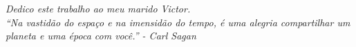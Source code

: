 \begin{dedicatoria}
   \vspace*{\fill}
   \centering
   \noindent
   \textit{Dedico este trabalho ao meu marido Victor. \\ ``Na vastidão do espaço e na imensidão do tempo, é uma alegria compartilhar um planeta e uma época com você.'' - Carl Sagan} \vspace*{\fill}
\end{dedicatoria}
